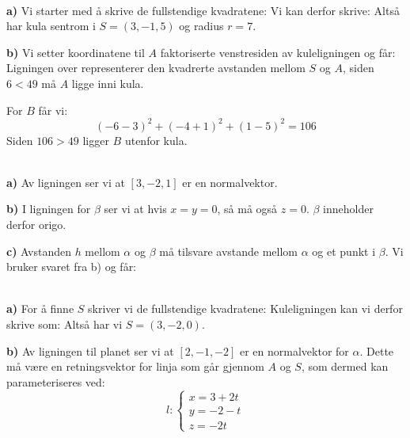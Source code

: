  

\\
\textbf{a)} Vi starter med å skrive de fullstendige kvadratene:
Vi kan derfor skrive:
Altså har kula sentrom i $ S=(3, -1, 5) $ og radius $ r=7 $.

\textbf{b)} Vi setter koordinatene til $ A $ faktoriserte venstresiden av kuleligningen og får:
Ligningen over representerer den kvadrerte avstanden mellom $ S $ og $ A $, siden $ 6<49 $ må $ A $ ligge inni kula.

For $ B $ får vi:
\[ (-6-3)^2+(-4+1)^2 +(1-5)^2 = 106 \]
Siden $ 106>49 $ ligger $ B $ utenfor kula.

\\
\textbf{a)} Av ligningen ser vi at $ [3, -2, 1] $ er en normalvektor.

\textbf{b)} I ligningen for $ \beta $ ser vi at hvis $ x=y=0 $, så må også $ z=0 $. $ \beta $ inneholder derfor origo.

\textbf{c)} Avstanden $ h $ mellom $ \alpha $ og $ \beta $ må tilsvare avstande mellom $ \alpha $ og et punkt i $ \beta $. Vi bruker svaret fra b) og får:

\\
\textbf{a)} For å finne $ S $ skriver vi de fullstendige kvadratene:
Kuleligningen kan vi derfor skrive som:
Altså har vi $ S=(3, -2, 0) $.

\textbf{b)} Av ligningen til planet ser vi at $ [2, -1, -2] $ er en normalvektor for $ \alpha $. Dette må være en retningsvektor for linja som går gjennom $ A $ og $ S $, som dermed kan parameteriseres ved:
\[ l: \left\lbrace{
	\begin{array}{l}
	x=3+ 2t  \\
	y=-2-t   \\
	z=-2t
	\end{array}
}\right.  \]

